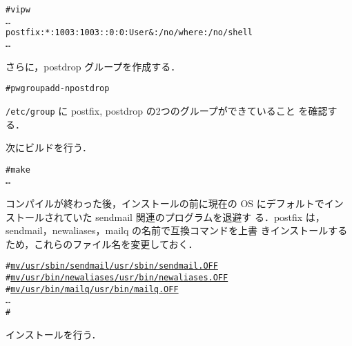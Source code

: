 \begin{center}
\begin{breakbox}
\begin{alltt}
#vipw
    …
postfix:*:1003:1003::0:0:User \&:/no/where:/no/shell
    …
\end{alltt}
\end{breakbox}
\end{center}

さらに，postdrop グループを作成する．
\begin{center}
\begin{breakbox}
\begin{alltt}
#pw groupadd -n postdrop
\end{alltt}
\end{breakbox}
\end{center}

\texttt{/etc/group} に postfix, postdrop の2つのグループができていること
を確認する．

次にビルドを行う．

\begin{center}
\begin{breakbox}
\begin{alltt}
#make
…
\end{alltt}
\end{breakbox}
\end{center}

コンパイルが終わった後，インストールの前に現在の OS にデフォルトでイン
ストールされていた sendmail 関連のプログラムを退避す
る．postfix は，sendmail，newaliases，mailq の名前で互換コマンドを上書
きインストールするため，これらのファイル名を変更しておく．

\begin{center}
\begin{breakbox}
\begin{alltt}
# \underline{mv /usr/sbin/sendmail /usr/sbin/sendmail.OFF}
# \underline{mv /usr/bin/newaliases /usr/bin/newaliases.OFF}
# \underline{mv /usr/bin/mailq /usr/bin/mailq.OFF}
…
#
\end{alltt}
\end{breakbox}
\end{center}

インストールを行う．

